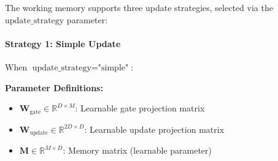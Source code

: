 \documentclass{article}
\begin{document}
The working memory supports three update strategies, selected via the $\text{update\_strategy}$ parameter:

\paragraph{Strategy 1: Simple Update}

When $\text{update\_strategy} = \text{"simple"}$:

\textbf{Parameter Definitions:}
\begin{itemize}
\item $\mathbf{W}_{\text{gate}} \in \mathbb{R}^{D \times M}$: Learnable gate projection matrix
\item $\mathbf{W}_{\text{update}} \in \mathbb{R}^{2D \times D}$: Learnable update projection matrix
\item $\mathbf{M} \in \mathbb{R}^{M \times D}$: Memory matrix (learnable parameter)
\end{itemize}
\end{document}
